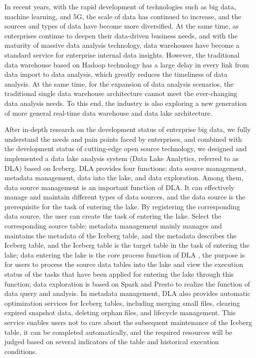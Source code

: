 \begin{abstract*}

In recent years, with the rapid development of technologies such as big data,
machine learning, and 5G, the scale of data has continued to increase, and the
sources and types of data have become more diversified. At the same time, as
enterprises continue to deepen their data-driven business needs, and with the
maturity of massive data analysis technology, data warehouses have become a
standard service for enterprise internal data insights. However, the traditional
data warehouse based on Hadoop technology has a large delay in every link from data
import to data analysis, which greatly reduces the timeliness of data analysis.
At the same time, for the expansion of data analysis scenarios, the traditional
single data warehouse architecture cannot meet the ever-changing data analysis
needs. To this end, the industry is also exploring a new generation of more general
real-time data warehouse and data lake architecture.

After in-depth research on the development status of enterprise big data, we fully
understand the needs and pain points faced by enterprises, and combined with the
development status of cutting-edge open source technology, we designed and implemented
a data lake analysis system (Data Lake Analytics, referred to as DLA) based on Iceberg.
DLA provides four functions: data source management, metadata management, data into the
lake, and data exploration. Among them, data source management is an important function
of DLA. It can effectively manage and maintain different types of data sources, and the
data source is the prerequisite for the task of entering the lake. By registering the
corresponding data source, the user can create the task of entering the lake. Select
the corresponding source table; metadata management mainly manages and maintains the
metadata of the Iceberg table, and the metadata describes the Iceberg table, and the
Iceberg table is the target table in the task of entering the lake; data entering the
lake is the core process function of DLA , the purpose is for users to process the
source data tables into the lake and view the execution status of the tasks that have
been applied for entering the lake through this function; data exploration is based on
Spark and Presto to realize the function of data query and analysis. In metadata management,
DLA also provides automatic optimization services for Iceberg tables, including merging
small files, clearing expired snapshot data, deleting orphan files, and lifecycle management.
This service enables users not to care about the subsequent maintenance of the Iceberg table,
it can be completed automatically, and the required resources will be judged based on several
indicators of the table and historical execution conditions.


\end{abstract*}
